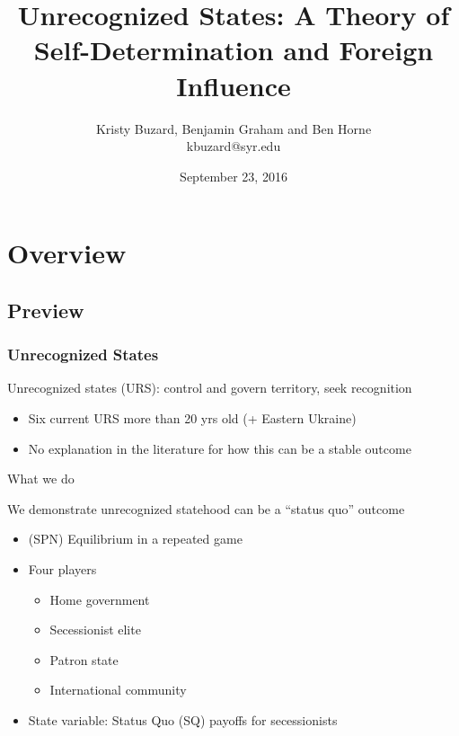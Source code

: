 \documentclass[handout]{beamer}
\begin{document}
\title[Unrecognized States: A Theory of Self-Determination and Foreign Influence\hspace{1.25in}\insertframenumber/\inserttotalframenumber]{Unrecognized States: A Theory of Self-Determination and Foreign Influence}
\author[Kristy Buzard, Benjamin Graham and Ben Horne]{Kristy Buzard, Benjamin Graham and Ben Horne\\ kbuzard@syr.edu}
\date{September 23, 2016}
\maketitle



\section{Overview}
\subsection{Preview}
\begin{frame}
\frametitle{Unrecognized States}
Unrecognized states (URS): control and govern territory, seek recognition
\pause
\begin{itemize}[<+->]
  \item Six current URS more than 20 yrs old (+ Eastern Ukraine)
	\item No explanation in the literature for how this can be a stable outcome
\end{itemize}
\end{frame}


\begin{frame}{What we do}

\pause
We demonstrate unrecognized statehood can be a ``status quo'' outcome
\pause
\begin{itemize}[<+->]
	\item (SPN) Equilibrium in a repeated game
	\item Four players
		\begin{itemize}[<+->]
			\item Home government
			\item Secessionist elite
			\item Patron state
			\item International community
		\end{itemize}
	\item State variable: Status Quo (SQ) payoffs for secessionists
\end{itemize}

\end{frame}
\end{document}
